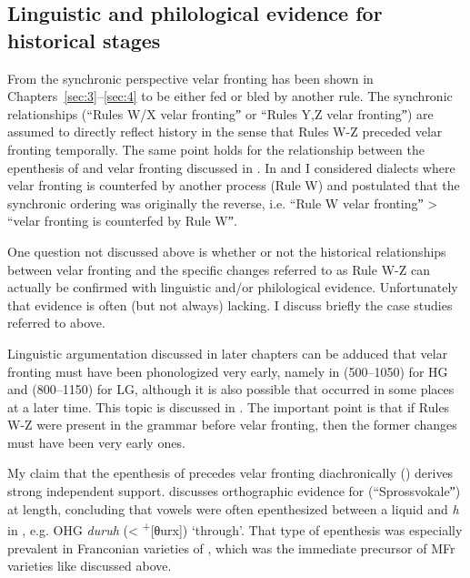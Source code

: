 \subsection{Linguistic and philological evidence for historical stages}\label{sec:5.5.2}

From the synchronic perspective velar fronting has been shown in Chapters~\ref{sec:3}--\ref{sec:4} to be either fed or bled by another rule. The synchronic relationships (“Rules W/X  velar frontingˮ or “Rules Y,Z  velar frontingˮ) are assumed to directly reflect history in the sense that Rules W-Z preceded velar fronting temporally. The same point holds for the relationship between the epenthesis of  and velar fronting discussed in . In  and  I considered dialects where velar fronting is counterfed by another process (Rule W) and postulated that the synchronic ordering was originally the reverse, i.e. “Rule W  velar frontingˮ > “velar fronting is counterfed by Rule Wˮ.

One question not discussed above is whether or not the historical relationships between velar fronting and the specific changes referred to as Rule W-Z can actually be confirmed with linguistic and/or philological evidence. Unfortunately that evidence is often (but not always) lacking. I discuss briefly the case studies referred to above.

Linguistic argumentation discussed in later chapters can be adduced that velar fronting must have been phonologized very early, namely in  (500--1050) for HG and  (800--1150) for LG, although it is also possible that  occurred in some places at a later time. This topic is discussed in . The important point is that if Rules W-Z were present in the grammar before velar fronting, then the former changes must have been very early ones.

My claim that the epenthesis of  precedes velar fronting diachronically () derives strong independent support. \citet[71--73]{Braune2004} discusses orthographic evidence for  (“Sprossvokaleˮ) at length, concluding that vowels were often epenthesized between a liquid and \textit{h} in , e.g. OHG \textit{duruh} (<  \textsuperscript{+}[θurx]) ‘through’. That type of epenthesis was especially prevalent in Franconian varieties of , which was the immediate precursor of MFr varieties like  discussed above.

